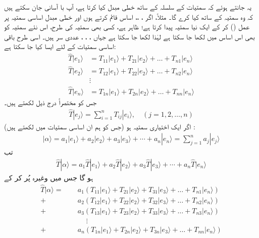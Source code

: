 یہ جانتے ہوئے کہ   سمتیات کے سلسلہ کے ساتھ خطی مبدل کیا کرتا ہے،  آپ با آسانی جان   سکتے ہیں کہ وہ   سمتیہ کے ساتھ کیا کرے گا۔ مثلاً،   اگر  ، ،،  اساس قائم کرتے ہوں  اور خطی مبدل  اساسی سمتیہ  پر عمل () کر کے  ایک  نیا سمتیہ  پیدا کرتا ہے؛ ظاہر ہے، کسی بھی سمتیہ کی طرح،  اس نئے سمتیہ کو بھی اس اساس میں لکھا جا سکتا ہے لہٰذا 
 لکھا جا سکتا ہے جہاں ، ، ،  عددی سر ہیں۔ اسی طرح باقی اساسی سمتیات کے لئے ایسا کیا جا سکتا ہے:
\begin{align*}
	\hat{T}|e_1\rangle &= T_{11}|e_1\rangle+T_{21}|e_2\rangle+\dots+T_{n1}|e_n\rangle\\
	\hat{T}|e_2\rangle &= T_{12}|e_1\rangle+T_{22}|e_2\rangle+\dots+T_{n2}|e_n\rangle\\
	&\vdots\\
	\hat{T}|e_n\rangle &= T_{1n}|e_1\rangle+T_{2n}|e_2\rangle+\dots+T_{nn}|e_n\rangle
\end{align*}
جس کو مختصراً درج ذیل لکھتے ہیں۔
\begin{align}\label{مساوات_ضمیمہ_خطی_تبادلہ}
	\hat{T}|e_{j}\rangle=\sum_{i=1}^{n}T_{ij}|e_i\rangle,\quad(j=1, 2, \dots, n)
\end{align}
اگر  ایک اختیاری سمتیہ ہو  (جس کو  ہم ان اساسی سمتیات میں لکھتے ہیں) :
\begin{align}\label{مساوات_ضمیمہ_اختیاری_سمتیہ}
	|\alpha\rangle=a_1|e_1\rangle+a_2|e_2\rangle+a_3|e_3\rangle+\cdots+a_n|e_n\rangle=\sum_{j=1}^{n}a_j|e_j\rangle
\end{align}
  تب
\begin{align*}
\hat{T}|\alpha\rangle= a_1\hat{T}|e_1\rangle+ a_2\hat{T}|e_2\rangle+ a_3\hat{T}|e_3\rangle+\cdots+ a_n\hat{T}|e_n\rangle
\end{align*}
ہو گا  جس میں  وغیرہ پُر کر کے
\begin{align*}
\hat{T}|\alpha\rangle=\phantom{+}& a_1(T_{11}|e_1\rangle+T_{21}|e_2\rangle+T_{31}|e_3\rangle+\dots+T_{n1}|e_n\rangle)\\
+&a_2(T_{12}|e_1\rangle+T_{22}|e_2\rangle+T_{32}|e_3\rangle+\dots+T_{n2}|e_n\rangle)\\
+&a_3(T_{13}|e_1\rangle+T_{23}|e_2\rangle+T_{33}|e_3\rangle+\dots+T_{n3}|e_n\rangle)\\
&\phantom{+}\vdots\\
+&a_n(T_{1n}|e_1\rangle+T_{2n}|e_2\rangle+T_{3n}|e_3\rangle+\dots+T_{nn}|e_n\rangle)
\end{align*}
